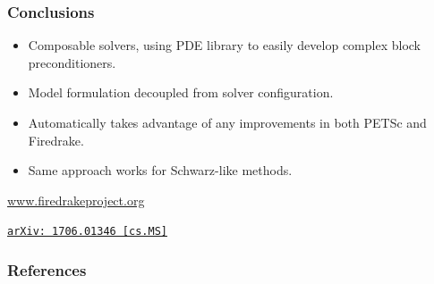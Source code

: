 \documentclass[presentation,aspectratio=43]{beamer}
\newcommand{\arxivlink}[2]{%
  \href{http://www.arxiv.org/abs/#1}%
  {{\small\texttt{arXiv:\,#1\,[#2]}}}%
}
\begin{document}
\begin{frame}
  \frametitle{Conclusions}

  \begin{itemize}
  \item Composable solvers, using PDE library to easily
    develop complex block preconditioners.

  \item Model formulation decoupled from solver configuration.

  \item Automatically takes advantage of any improvements in both
    PETSc and Firedrake.

  \item Same approach works for Schwarz-like methods.
  \end{itemize}
  \begin{center}
    \url{www.firedrakeproject.org}
  \end{center}

  \begin{flushright}
    {\footnotesize
    \textcite{Kirby:2018} \arxivlink{1706.01346}{cs.MS}}
  \end{flushright}
\end{frame}
\appendix
\begin{frame}
  \frametitle{References}
  \printbibliography[heading=none]
\end{frame}
\end{document}

